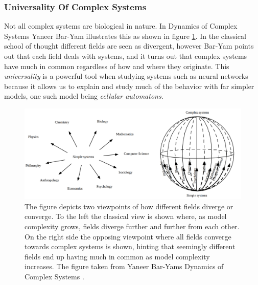 \subsubsection{Universality Of Complex Systems}
Not all complex systems are biological in nature.
In Dynamics of Complex Systems Yaneer Bar-Yam illustrates this as shown in figure
\ref{figCX}.
In the classical school of thought different fields are seen as divergent,
however Bar-Yam points out that each field deals with systems, and it turns out
that complex systems have much in common regardless of how and where they
originate.
This \emph{universality} is a powerful tool when studying systems such as neural
networks because it allows us to explain and study much of the behavior with far
simpler models, one such model being \emph{cellular automatons}\cite{von66BURKS}.
\begin{figure}[h!]
  \centering
  \includegraphics[width=1\textwidth]{fig/BarYamCX.png}
  \caption{
    The figure depicts two viewpoints of how different fields diverge or
    converge.
    To the left the classical view is shown where, as model complexity grows,
    fields diverge further and further from each other.
    On the right side the opposing viewpoint where all fields converge towards
    complex systems is shown, hinting that seemingly different fields end up
    having much in common as model complexity increases.
    The figure taken from Yaneer Bar-Yams Dynamics of Complex Systems \cite{Yaneer97}.
  }
  \label{figCX}
\end{figure}
